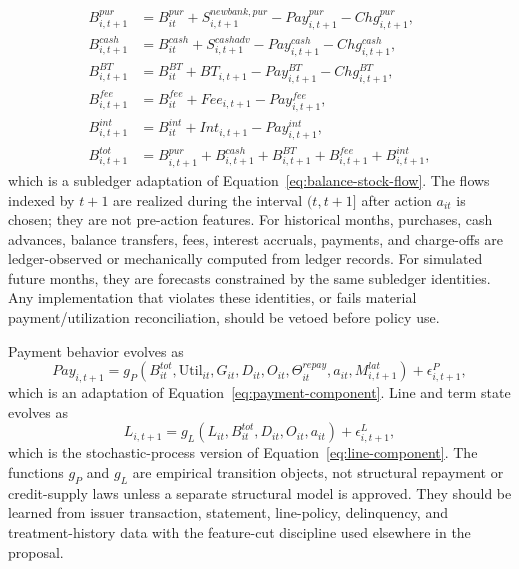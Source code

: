\documentclass[11pt]{article}
\newcommand{\1}{\mathbf{1}}
\begin{document}
\begin{align}
  B^{pur}_{i,t+1}
    &= B^{pur}_{it} + S^{newbank,pur}_{i,t+1} - Pay^{pur}_{i,t+1}
       - Chg^{pur}_{i,t+1},
       \label{eq:ss-balance-pur}\\
  B^{cash}_{i,t+1}
    &= B^{cash}_{it} + S^{cashadv}_{i,t+1} - Pay^{cash}_{i,t+1}
       - Chg^{cash}_{i,t+1},
       \label{eq:ss-balance-cash}\\
  B^{BT}_{i,t+1}
    &= B^{BT}_{it} + BT_{i,t+1} - Pay^{BT}_{i,t+1}
       - Chg^{BT}_{i,t+1},
       \label{eq:ss-balance-bt}\\
  B^{fee}_{i,t+1}
    &= B^{fee}_{it} + Fee_{i,t+1} - Pay^{fee}_{i,t+1},
       \label{eq:ss-balance-fee}\\
  B^{int}_{i,t+1}
    &= B^{int}_{it} + Int_{i,t+1} - Pay^{int}_{i,t+1},
       \label{eq:ss-balance-int}\\
  B^{tot}_{i,t+1}
    &= B^{pur}_{i,t+1}+B^{cash}_{i,t+1}+B^{BT}_{i,t+1}
       +B^{fee}_{i,t+1}+B^{int}_{i,t+1},
       \label{eq:ss-balance-total}
\end{align}
which is a subledger adaptation of Equation~\eqref{eq:balance-stock-flow}. The
flows indexed by $t+1$ are realized during the interval $(t,t+1]$ after action
$a_{it}$ is chosen; they are not pre-action features.
For historical months, purchases, cash advances, balance transfers, fees,
interest accruals, payments, and charge-offs are ledger-observed or
mechanically computed from ledger records. For simulated future months, they
are forecasts constrained by the same subledger identities. Any implementation
that violates these identities, or fails material payment/utilization
reconciliation, should be vetoed before policy use.

Payment behavior evolves as
\begin{equation}
  Pay_{i,t+1}
  =
  g_P(B^{tot}_{it},\mathrm{Util}_{it},G_{it},D_{it},O_{it},\Theta^{repay}_{it},a_{it},M^{lat}_{i,t+1})
  + \epsilon^P_{i,t+1},
  \label{eq:ss-payment-transition}
\end{equation}
which is an adaptation of Equation~\eqref{eq:payment-component}. Line and term
state evolves as
\begin{equation}
  L_{i,t+1}
  =
  g_L(L_{it},B^{tot}_{it},D_{it},O_{it},a_{it}) + \epsilon^L_{i,t+1},
  \label{eq:ss-line-transition}
\end{equation}
which is the stochastic-process version of Equation~\eqref{eq:line-component}.
The functions $g_P$ and $g_L$ are empirical transition objects, not structural
repayment or credit-supply laws unless a separate structural model is approved.
They should be learned from issuer transaction, statement, line-policy,
delinquency, and treatment-history data with the feature-cut discipline used
elsewhere in the proposal.
\end{document}

